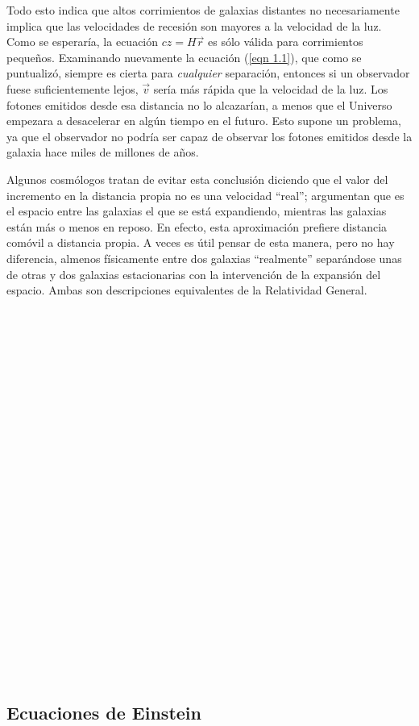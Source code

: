 \documentclass[a4paper,openright,12pt]{book}
\begin{document}
Todo esto indica que altos corrimientos de galaxias distantes no necesariamente implica que las velocidades de recesión son mayores a la velocidad de la luz. Como se esperaría, la ecuación $cz = H\vec{r}$ es sólo válida para corrimientos pequeños. Examinando nuevamente la ecuación (\ref{eqn 1.1}), que como se puntualizó, siempre es cierta para \textit{cualquier} separación, entonces si un observador fuese suficientemente lejos, $\vec{v}$ sería más rápida que la velocidad de la luz. Los fotones emitidos desde esa distancia no lo alcazarían, a menos que el Universo empezara a desacelerar en algún tiempo en el futuro. Esto supone un problema, ya que el observador no podría ser capaz de observar los fotones emitidos desde la galaxia hace miles de millones de años.

Algunos cosmólogos tratan de evitar esta conclusión diciendo que el valor del incremento en la distancia propia no es una velocidad ``real''; argumentan que es el espacio entre las galaxias el que se está expandiendo, mientras las galaxias están más o menos en reposo. En efecto, esta aproximación prefiere distancia comóvil a distancia propia. A veces es útil pensar de esta manera, pero no hay diferencia, almenos físicamente entre dos galaxias ``realmente'' separándose unas de otras y dos galaxias estacionarias con la intervención de la expansión del espacio. Ambas son descripciones equivalentes de la Relatividad General.\\\\\\\\\\\\\\\\\\\\\\\\\\\\\\\\\\\\\\\\\\\\\\\\\


\subsection*{Ecuaciones de Einstein}
\end{document}
